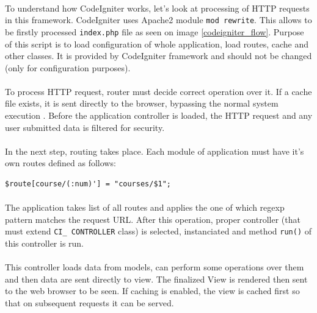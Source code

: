 \paragraph{}
To understand how CodeIgniter works, let's look at processing of HTTP requests in this framework. CodeIgniter uses Apache2  module \texttt{mod rewrite}. This allows to be firstly processed \texttt{index.php} file as seen on image \ref{codeigniter_flow}. Purpose of this script is to load configuration of whole application, load routes, cache and other classes. It is provided by CodeIgniter framework and should not be changed (only for configuration purposes).

\paragraph{}
To process HTTP request, router must decide correct operation over it. If a cache file exists, it is sent directly to the browser, bypassing the normal system execution \cite{codeigniter}. Before the application controller is loaded, the HTTP request and any user submitted data is filtered for security.

\paragraph{}
In the next step, routing takes place. Each module of application must have it's own routes defined as follows:

\begin{lstlisting}[basicstyle=\small]
$route[course/(:num)'] = "courses/$1";
\end{lstlisting}


\paragraph{}
The application takes list of all routes and applies the one of which regexp pattern matches the request URL. After this operation, proper controller (that must extend \texttt{CI\_ CONTROLLER} class) is selected, instanciated and method \texttt{run()} of this controller is run.

\paragraph{}
This controller loads data from models, can perform some operations over them and then data are sent directly to view. The finalized View is rendered then sent to the web browser to be seen. If caching is enabled, the view is cached first so that on subsequent requests it can be served.

